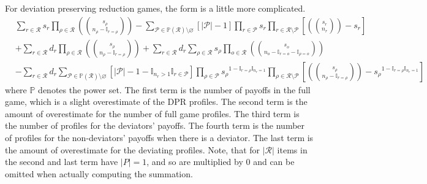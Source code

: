 \documentclass{article}
\newcommand{\reps}[2]{\left(\!\!{#1\choose #2}\!\!\right)}
\begin{document}
For deviation preserving reduction games, the form is a little more complicated.
\begin{equation*}
    \begin{split}
        & \sum_{r \in \mathcal R} s_r \prod_{\rho \in \mathcal R} \reps{s_\rho}{n_\rho - \mathbb{I}_{r = \rho}}
         - \sum_{\mathcal P \in \mathbb P(\mathcal R) \setminus \varnothing} \left[ |\mathcal P| - 1 \right] \prod_{r \in \mathcal P} s_r \prod_{r \in \mathcal R \setminus \mathcal P} \left[ \reps{s_r}{n_r} - s_r \right] \\
        & + \sum_{r \in \mathcal R} d_r \prod_{\rho \in \mathcal R} \reps{s_\rho}{n_\rho - \mathbb{I}_{r = \rho}}
        + \sum_{r \in \mathcal R} d_r \sum_{\rho \in \mathcal R} s_\rho \prod_{o \in \mathcal R} \reps{s_o}{n_o - \mathbb{I}_{r = o} - \mathbb{I}_{\rho = o}} \\
        & - \sum_{r \in \mathcal R} d_r \sum_{\mathcal P \in \mathbb P(\mathcal R) \setminus \varnothing} \left[ |\mathcal P| - 1 - \mathbb{I}_{n_r > 1} \mathbb{I}_{r \in \mathcal P} \right] \prod_{\rho \in \mathcal P} {s_\rho}^{1 - \mathbb{I}_{r = \rho} \mathbb{I}_{n_r = 1}} \prod_{\rho \in \mathcal R \setminus \mathcal P} \left[ \reps{s_\rho}{n_\rho - \mathbb{I}_{r = \rho}} - {s_\rho}^{1 - \mathbb{I}_{r = \rho} \mathbb{I}_{n_r = 1}} \right]
    \end{split}
\end{equation*}
where $\mathbb P$ denotes the power set.
The first term is the number of payoffs in the full game, which is a slight overestimate of the DPR profiles.
The second term is the amount of overestimate for the number of full game profiles.
The third term is the number of profiles for the deviators' payoffs.
The fourth term is the number of profiles for the non-deviators' payoffs when there is a deviator.
The last term is the amount of overestimate for the deviating profiles.
Note, that for $|\mathcal R|$ items in the second and last term have $|P| = 1$, and so are multiplied by 0 and can be omitted when actually computing the summation.
\end{document}
